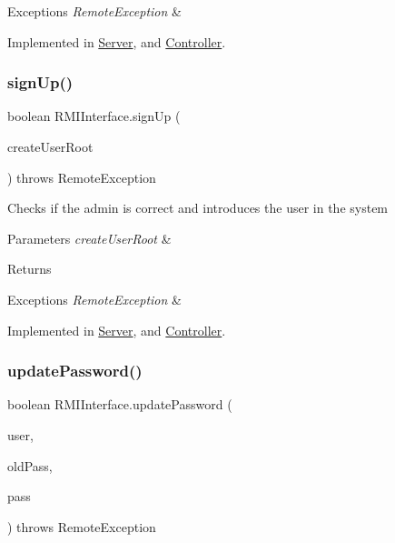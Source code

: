 \begin{DoxyExceptions}{Exceptions}
{\em Remote\+Exception} & \\
\hline
\end{DoxyExceptions}


Implemented in \hyperlink{class_server_a817e1af39aeac07664ce011c44013e55}{Server}, and \hyperlink{class_controller_a8de8d716dde3d96111ef13686c91b10f}{Controller}.

\mbox{\label{interface_r_m_i_interface_a39fbf15bb1115837ce6025aaa47784bb}} 
\subsubsection{\texorpdfstring{sign\+Up()}{signUp()}}
{\footnotesize\ttfamily boolean R\+M\+I\+Interface.\+sign\+Up (\begin{DoxyParamCaption}\item[{\hyperlink{class_create_user_root}{Create\+User\+Root}}]{create\+User\+Root }\end{DoxyParamCaption}) throws Remote\+Exception}

Checks if the admin is correct and introduces the user in the system 
\begin{DoxyParams}{Parameters}
{\em create\+User\+Root} & \\
\hline
\end{DoxyParams}
\begin{DoxyReturn}{Returns}

\end{DoxyReturn}

\begin{DoxyExceptions}{Exceptions}
{\em Remote\+Exception} & \\
\hline
\end{DoxyExceptions}


Implemented in \hyperlink{class_server_a9e4fcd4cc8bfb0484735adfcf38be657}{Server}, and \hyperlink{class_controller_aa4680640bce9264c99dd4cc928d31384}{Controller}.

\mbox{\label{interface_r_m_i_interface_a643b5963469fbc121032c7d75c01c7b9}} 
\subsubsection{\texorpdfstring{update\+Password()}{updatePassword()}}
{\footnotesize\ttfamily boolean R\+M\+I\+Interface.\+update\+Password (\begin{DoxyParamCaption}\item[{String}]{user,  }\item[{String}]{old\+Pass,  }\item[{String}]{pass }\end{DoxyParamCaption}) throws Remote\+Exception}

